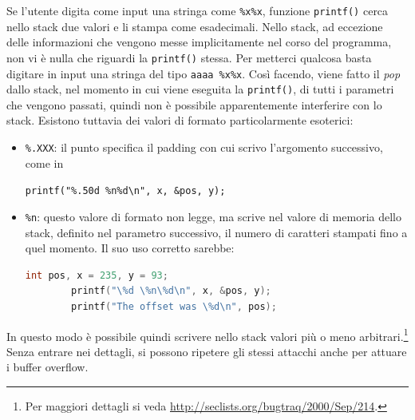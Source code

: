 Se l'utente digita come input una stringa come \texttt{\%x\%x}, funzione \texttt{printf()} cerca nello stack due valori e li stampa come esadecimali. Nello stack, ad eccezione delle informazioni che vengono messe implicitamente nel corso del programma, non vi è nulla che riguardi la \texttt{printf()} stessa. Per metterci qualcosa basta digitare in input una stringa del tipo \texttt{aaaa \%x\%x}. Così facendo, viene fatto il \textit{pop} dallo stack, nel momento in cui viene eseguita la \texttt{printf()}, di tutti i parametri che vengono passati, quindi non è possibile apparentemente interferire con lo stack. Esistono tuttavia dei valori di formato particolarmente esoterici:
\begin{itemize}
	\item \texttt{\%.XXX}: il punto specifica il padding con cui scrivo l'argomento successivo, come in
	\begin{center}
		\texttt{printf("\%.50d \%n\%d\textbackslash n", x, \&pos, y);}
	\end{center}
	\item \texttt{\%n}: questo valore di formato non legge, ma scrive nel valore di memoria dello stack, definito nel parametro successivo, il numero di caratteri stampati fino a quel momento. Il suo uso corretto sarebbe:
	\begin{lstlisting}[language=C]
		int pos, x = 235, y = 93;
		printf("\%d \%n\%d\n", x, &pos, y);
		printf("The offset was \%d\n", pos);
	\end{lstlisting}
\end{itemize}
In questo modo è possibile quindi scrivere nello stack valori più o meno arbitrari.\footnote{Per maggiori dettagli si veda \url{http://seclists.org/bugtraq/2000/Sep/214}.} Senza entrare nei dettagli, si possono ripetere gli stessi attacchi anche per attuare i buffer overflow.